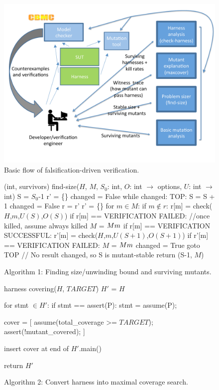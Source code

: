 \documentclass[conference]{IEEEtran}
\begin{document}
\begin{figure}
\includegraphics[width=\columnwidth]{TestFlow}
\caption{Basic flow of falsification-driven verification.}
\label{fig:flow}
\end{figure}

\begin{figure}
{\scriptsize 
\begin{code}
(int, survivors) find-size($H$, $M$, $S_0$: int,
                           $O$: int $\rightarrow$ options,
                           $U$: int $\rightarrow$ int) 
\vspace{0.1in}
S = $S_0$-1 
r' = \{\}
changed = False 
while changed:
   TOP:
   S = S + 1 
   changed = False 
   r = r' 
   r' = \{\}
   for $m \in M$:
      if $m \not\in r$:
         r[m] = check($H$,$m$,$U(S)$,$O(S)$) 
         if r[m] == VERIFICATION FAILED:
            //once killed, assume always killed 
            $M$ = $M \\ m$
      if r[m] == VERIFICATION SUCCESSFUL:
         r'[m] = check($H$,$m$,$U(S+1)$,$O(S+1)$) 
         if r'[m] == VERIFICATION FAILED:
            $M$ = $M \\ m$
            changed = True 
            goto TOP 
// No result changed, so S is mutant-stable 
return (S-1, $M$) 
\end{code}
}
\caption{Algorithm 1: Finding size/unwinding bound and surviving mutants.}
\label{alg:unwind}
\end{figure}

\begin{figure}
{\scriptsize 
\begin{code}
harness covering($H$, $TARGET$) 
\vspace{0.1in}
$H'$ = $H$

for stmt $\in H'$:
   if stmt == assert(P):
      stmt = assume(P);

cover = [
  assume(total\_coverage >= $TARGET$); 
  assert(!mutant\_covered);
]

insert cover at end of $H'$.main() 

return $H'$
\end{code}
}
\caption{Algorithm 2: Convert harness into maximal coverage search.}
\label{alg:invert}
\end{figure}
\end{document}

